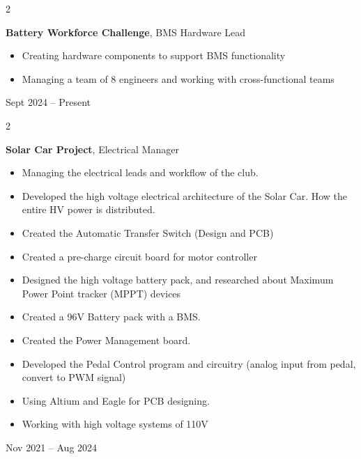 \documentclass[10pt, letterpaper]{article}
\newenvironment{highlights}{
    \begin{itemize}[
        topsep=0.10 cm,
        parsep=0.10 cm,
        partopsep=0pt,
        itemsep=0pt,
        leftmargin=0.4 cm + 10pt
    ]
}{
    \end{itemize}
} %
\newenvironment{twocolentry}[2][]{
    \onecolentry
    \def\secondColumn{#2}
    \setcolumnwidth{\fill, 4.5 cm}
    \begin{paracol}{2}
}{
    \switchcolumn \raggedleft \secondColumn
    \end{paracol}
    \endonecolentry
} %
\begin{document}
        \begin{twocolentry}{

        Sept 2024 – Present
        }
            \textbf{Battery Workforce Challenge}, BMS Hardware Lead
            \begin{highlights}
                \item Creating hardware components to support BMS functionality
                \item Managing a team of 8 engineers and working with cross-functional teams
      
            \end{highlights}
        \end{twocolentry}
        
        \begin{twocolentry}{

        Nov 2021 – Aug 2024
        }
            \textbf{Solar Car Project}, Electrical Manager
            \begin{highlights}
                \item   Managing the electrical leads and workflow of the club.
                \item   Developed the high voltage electrical architecture of the Solar Car. How the entire HV power is distributed.
                \item   Created the Automatic Transfer Switch (Design and PCB)
                \item   Created a pre-charge circuit board for motor controller
                \item   Designed the high voltage battery pack, and researched about Maximum Power Point tracker (MPPT) devices
                \item   Created a 96V Battery pack with a BMS.
                \item   Created the Power Management board. 
                \item   Developed the Pedal Control program and circuitry (analog input from pedal, convert to PWM signal)
                \item   Using Altium and Eagle for PCB designing.
                \item	Working with high voltage systems of 110V 
                \\ %
                


            \end{highlights}
        \end{twocolentry}
\end{document}
